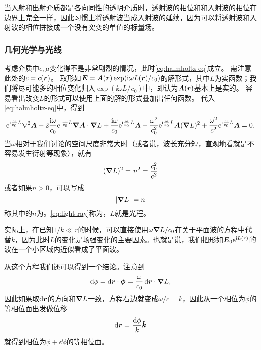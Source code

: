 当入射和出射介质都是各向同性的透明介质时，透射波的相位和和入射波的相位在边界上完全一样，因此习惯上将透射波当成入射波的延续，因为可以将透射波和入射波的相位拼接成一个没有突变的单值的标量场。

\subsubsection{几何光学与光线}

考虑介质中$\epsilon, \mu$变化得不是非常剧烈的情况，此时\eqref{eq:halmholtz-eq}成立。
需注意此处的$c=c(\vb*{r})$。
取形如$\vb*{E} = \vb*{A}(\vb*{r}) \exp (\mathrm{i} \omega L(\vb*{r}) / c_0)$的解形式，其中$L$为实函数；我们将尽可能多的相位变化归入$\exp(\ii \omega L / c_0)$中，即认为$\vb*{A}(\vb*{r})$基本上是实的。
容易看出改变$L$的形式可以使用上面的解的形式叠加出任何函数。
代入\eqref{eq:halmholtz-eq}中，得到
\begin{equation}
    \ee^{\ii \frac{\omega}{c_0} L} \laplacian \vb*{A} 
    + 2 \frac{\ii \omega}{c_0} \ee^{\ii \frac{\omega}{c_0} L} \grad{\vb*{A}} \cdot \grad{L} 
    + \frac{\ii \omega}{c_0} \ee^{\ii \frac{\omega}{c_0} L} \vb*{A} 
    - \frac{\omega^2}{c_0^2} \ee^{\ii \frac{\omega}{c_0} L} \vb*{A} (\grad{L})^2 
    + \frac{\omega^2}{c^2} \ee^{\ii \frac{\omega}{c_0} L} \vb*{A} = 0.
    \label{eq:expanded-wave-eq}
\end{equation}
当$\omega$相对于我们讨论的空间尺度非常大时（或者说，波长充分短，直观地看就是不容易发生衍射等现象），就有
\begin{equation}
    (\grad{L})^2 = n^2 = \frac{c_0^2}{c^2}
    \label{eq:optical-distance}
\end{equation}
或者如果$n>0$，可以写成
\[
    \abs{\grad{L}} = n
\]
称其中的$n$为。\eqref{eq:light-ray}称为，$L$就是光程。

实际上，在已知$1/k \ll r$的时候，可以直接使用$\omega\grad{L}/c_0$在关于平面波的方程中代替$k$，因为此时$L$的变化是场强变化的主要因素。也就是说，我们把形如$\vb*{E}_0 \mathrm{e}^{\mathrm{i} L(r)}$的波在一个小区域内近似看成了平面波。

从这个方程我们还可以得到一个结论。注意到
\[
    \dd{\phi} = \dd{\vb*{r}} \cdot \vb*{\phi} = \frac{\omega}{c_0} \dd{\vb*{r}} \cdot \grad{L},
\]
因此如果取$\dd{\vb*{r}}$的方向和$\grad{L}$一致，方程右边就变成$\omega / c = k$，因此从一个相位为$\phi$的等相位面出发做位移
\begin{equation}
    \dd{\vb*{r}} = \frac{\dd{\phi}}{k}\vu*{k}
    \label{eq:phrase-movement}
\end{equation}
就得到相位为$\phi + \dd{\phi}$的等相位面。

